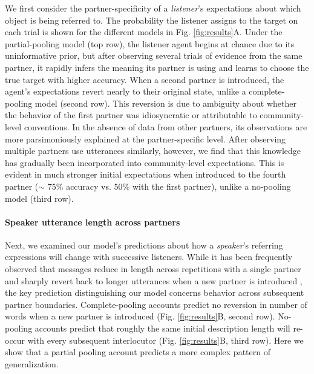 We first consider the partner-specificity of a \emph{listener}'s expectations about which object is being referred to.
The probability the listener assigns to the target on each trial is shown for the different models in Fig. \ref{fig:results}A.
Under the partial-pooling model (top row), the listener agent begins at chance due to its uninformative prior, but after observing several trials of evidence from the same partner, it rapidly infers the meaning its partner is using and learns to choose the true target with higher accuracy.
When a second partner is introduced, the agent's expectations revert nearly to their original state, unlike a complete-pooling model (second row).
This reversion is due to ambiguity about whether the behavior of the first partner was idiosyncratic or attributable to community-level conventions.
In the absence of data from other partners, its observations are more parsimoniously explained at the partner-specific level.
After observing multiple partners use utterances similarly, however, we find that this knowledge has gradually been incorporated into community-level expectations. 
This is evident in much stronger initial expectations when introduced to the fourth partner ($\sim$ 75\% accuracy vs. 50\% with the first partner), unlike a no-pooling model (third row).

\paragraph{Speaker utterance length across partners}

Next, we examined our model's predictions about how a \emph{speaker}'s referring expressions will change with successive listeners.
While it has been frequently observed that messages reduce in length across repetitions with a single partner \cite{krauss_changes_1964} and sharply revert back to longer utterances when a new partner is introduced \cite{wilkes-gibbs_coordinating_1992}, the key prediction distinguishing our model concerns behavior across subsequent partner boundaries.
Complete-pooling accounts predict no reversion in number of words when a new partner is introduced  (Fig. \ref{fig:results}B, second row).
No-pooling accounts predict that roughly the same initial description length will re-occur with every subsequent interlocutor  (Fig. \ref{fig:results}B, third row). 
Here we show that a partial pooling account predicts a more complex pattern of generalization.

